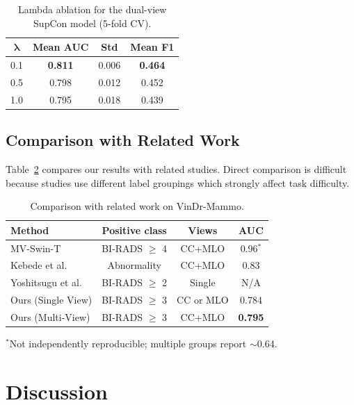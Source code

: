 \documentclass[runningheads]{llncs}
\begin{document}
\begin{table}[h]
\caption{Lambda ablation for the dual-view SupCon model (5-fold CV).}
\label{tab:lambda}
\centering
\begin{tabular}{|c|c|c|c|}
\hline
$\boldsymbol{\lambda}$ & \textbf{Mean AUC} & \textbf{Std} & \textbf{Mean F1} \\
\hline
0.1 & \textbf{0.811} & 0.006 & \textbf{0.464} \\
0.5 & 0.798 & 0.012 & 0.452 \\
1.0 & 0.795 & 0.018 & 0.439 \\
\hline
\end{tabular}
\end{table}

\subsection{Comparison with Related Work}

Table~\ref{tab:comparison} compares our results with related studies. Direct comparison is difficult because studies use different label groupings which strongly affect task difficulty.

\begin{table}[h]
\caption{Comparison with related work on VinDr-Mammo.}
\label{tab:comparison}
\centering
\begin{tabular}{|l|c|c|c|}
\hline
\textbf{Method} & \textbf{Positive class} & \textbf{Views} & \textbf{AUC} \\
\hline
MV-Swin-T~\cite{sarker2024mvswint}         & BI-RADS $\geq$ 4 & CC+MLO & 0.96$^*$ \\
Kebede et al.~\cite{kebede2024dual}        & Abnormality      & CC+MLO & 0.83 \\
Yoshitsugu et al.~\cite{yoshitsugu2026roi} & BI-RADS $\geq$ 2 & Single & N/A \\
\hline
Ours (Single View) & BI-RADS $\geq$ 3 & CC or MLO & 0.784 \\
Ours (Multi-View)  & BI-RADS $\geq$ 3 & CC+MLO    & \textbf{0.795} \\
\hline
\end{tabular}
\end{table}
{\small $^*$Not independently reproducible; multiple groups report $\sim$0.64.}

\section{Discussion}
\label{sec:discussion}
\end{document}
